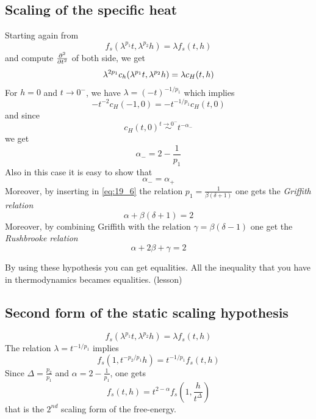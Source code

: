 \documentclass[../main/main.tex]{subfiles}
\begin{document}
\subsection{Scaling of the specific heat}
Starting again from
\begin{equation}
  f_s ( \lambda^{p_1} t, \lambda ^{p_2}h) = \lambda f_s (t,h)
\end{equation}
and compute \( \pdv[2]{}{t}  \) of both side, we get
\begin{equation}
  \lambda ^{2p_1}c_h \qty(\lambda ^{p_1}t, \lambda ^{p_2}h) = \lambda c_H (t,h)
\end{equation}
For \( h=0 \) and \( t \rightarrow 0^- \), we have \( \lambda = (-t)^{-1/p_1} \) which implies
\begin{equation}
  - t^{-2} c_H (-1,0) = - t ^{-1/p_1} c_H (t,0)
\end{equation}
and since
\begin{equation}
  c_H (t,0) \overset{t \rightarrow 0^-}{\sim } t^{-\alpha _-}
\end{equation}
we get
\begin{equation}
  \alpha _- = 2 - \frac{1}{p_1}
  \label{eq:19_6}
\end{equation}
Also in this case it is easy to show that
\begin{equation}
  \alpha _- = \alpha _+
\end{equation}
Moreover, by inserting in \eqref{eq:19_6} the relation \( p_1 = \frac{1}{\beta (\delta +1)} \) one gets the \emph{Griffith relation}
\begin{equation}
  \alpha + \beta (\delta +1) = 2
\end{equation}
Moreover, by combining Griffith with the relation \( \gamma = \beta (\delta -1)  \) one get the \emph{Rushbrooke relation}
\begin{equation}
  \alpha + 2 \beta + \gamma = 2
\end{equation}
\begin{remark}
By using these hypothesis you can get equalities. All the inequality that you have in thermodynamics becames equalities. (lesson)
\end{remark}

\subsection{Second form of the static scaling hypothesis}
\begin{equation}
  f_s ( \lambda^{p_1} t, \lambda ^{p_2}h) = \lambda f_s (t,h)
\end{equation}
The relation \( \lambda = t ^{-1/p_1} \) implies
\begin{equation}
  f_s (1,t^{-p_2/p_1}h) = t^{-1/p_1} f_s (t,h)
\end{equation}
Since \( \Delta = \frac{p_2}{p_1} \) and \( \alpha = 2 - \frac{1}{p_1} \), one gets
\begin{equation}
  f_s (t,h) = t^{2- \alpha } f_s (1, \frac{h}{t^{\Delta }})
\end{equation}
that is the \( 2^{nd} \) scaling form of the free-energy.
\end{document}
